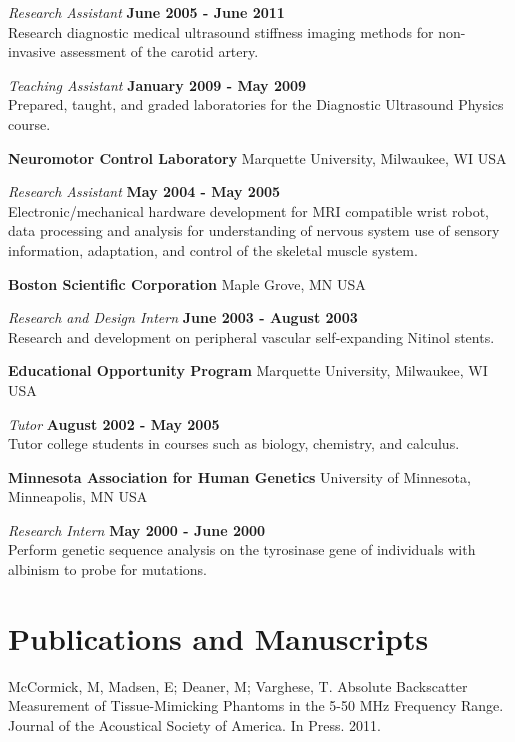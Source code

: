 \documentclass[margin,line]{res}
\begin{document}
\begin{resume}
\vspace{-.3cm}
{\em Research Assistant} \hfill {\bf June 2005 - June 2011} \\
Research diagnostic medical ultrasound stiffness imaging methods for non-invasive assessment of the carotid artery.

\vspace{-.3cm}
{\em Teaching Assistant} \hfill {\bf January 2009 - May 2009} \\
Prepared, taught, and graded laboratories for the Diagnostic Ultrasound Physics
course.

{\bf Neuromotor Control Laboratory} Marquette University, Milwaukee, WI USA

\vspace{-.3cm}
{\em Research Assistant} \hfill {\bf May 2004 - May 2005} \\
Electronic/mechanical hardware development for MRI compatible wrist robot, data processing and analysis for understanding of nervous system use of sensory information,  adaptation,  and control of the skeletal muscle system.

{\bf Boston Scientific Corporation} Maple Grove, MN USA

\vspace{-.3cm}
{\em Research and Design Intern} \hfill {\bf June 2003 - August 2003} \\
Research and development on peripheral vascular self-expanding Nitinol stents.

{\bf Educational Opportunity Program} Marquette University, Milwaukee, WI USA

\vspace{-.3cm}
{\em Tutor} \hfill {\bf August 2002 - May 2005} \\
Tutor college students in courses such as biology, chemistry, and calculus.

{\bf Minnesota Association for Human Genetics} University of Minnesota, Minneapolis, MN USA

\vspace{-.3cm}
{\em Research Intern} \hfill {\bf May 2000 - June 2000} \\
Perform genetic sequence analysis on the tyrosinase gene of individuals with albinism to probe for mutations.

\section{\sc Publications and Manuscripts}

McCormick, M, Madsen, E; Deaner, M; Varghese, T.  Absolute Backscatter
Measurement of Tissue-Mimicking Phantoms in the 5-50 MHz Frequency Range.  Journal of the
Acoustical Society of America.  In Press.  2011.


\end{resume}
\end{document}
